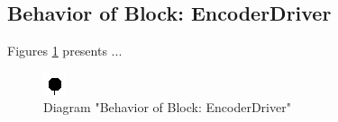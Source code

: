 \subsection{Behavior of Block: EncoderDriver}
Figures \ref{fig:EncoderDriverEncoderDriver24} presents ...
\begin{figure}[htb]
\centering
\includegraphics[width=\textwidth]{img_2_4.png}
\caption{Diagram "Behavior of Block: EncoderDriver"}
\label{fig:EncoderDriverEncoderDriver24}
\end{figure}

